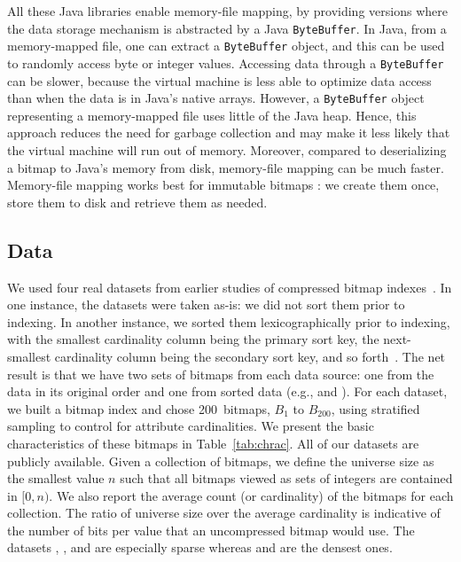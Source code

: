 \documentclass[times]{speauth}
\begin{document}
All these Java libraries enable memory-file mapping, by providing versions where the data storage mechanism is abstracted by a Java \texttt{ByteBuffer}. In Java, from a memory-mapped file, one can
extract a \texttt{ByteBuffer} object, and this can be used to randomly access byte or integer values.
Accessing data through a \texttt{ByteBuffer}  can be slower,  because the virtual machine is less able to optimize data access than when the data is in Java's native arrays.
 However, a \texttt{ByteBuffer} object representing a memory-mapped file uses little of the Java heap. 
Hence, this approach reduces the need for garbage collection and may make it less likely that the virtual machine will run out of memory. Moreover, compared to deserializing a bitmap to Java's memory from disk, memory-file mapping can be much faster.
Memory-file mapping works best
for immutable bitmaps%
: we
create them once, store them to disk and retrieve them as needed.

\subsection{Data}


We used four real datasets from earlier studies of
compressed bitmap indexes~\cite{SPE:SPE2325,LemireKaserGutarra-TODS}.
In one instance, the datasets were taken as-is: we did not sort them prior to indexing. In another instance, we sorted them
lexicographically prior to indexing, with the smallest cardinality column being the primary sort key,
the next-smallest cardinality column being the secondary sort key, and so forth~\cite{arxiv:0901.3751}. The net result is that we have two sets of bitmaps
from each data source: one from the data in its original order and one
from sorted data (e.g., \Censeighten{} and \Censeightensrt{}).
For each dataset, we built a bitmap index and
chose 200~bitmaps, $B_1$ to $B_{200}$,
using stratified sampling
 to control for attribute
cardinalities. We present the basic characteristics
of these bitmaps in Table~\ref{tab:chrac}. All of our datasets are publicly available.
Given a collection of bitmaps, we define the universe size as the smallest value $n$ such that all bitmaps viewed as sets of integers are contained in  $[0,n)$. We also report the average
count (or cardinality) of the bitmaps for each collection.
The ratio of universe size over the average cardinality is indicative of the number of bits per value that an uncompressed bitmap would use.
The datasets \Censeighten{}, \Censeightensrt{}, \Wikileaks{} and \Wikileakssrt{} are especially sparse whereas  \CensInc{} and \CensIncsrt{} are the densest ones.
\end{document}
